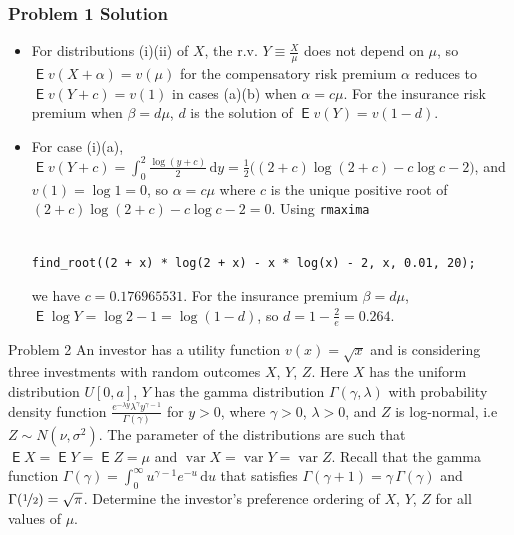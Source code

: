 \documentclass[10pt,handout]{beamer}
\newcommand{\ds}{\displaystyle}
\DeclareMathOperator\expc{\mathsf{E}}
\DeclareMathOperator\var{var}
\theoremstyle{definition}
\begin{document}
\begin{frame}[fragile]
  \frametitle{Problem 1 Solution}
  \begin{itemize}[<+->]
    \item For distributions (i)(ii) of $X$, the r.v. $\ds Y\equiv\frac{X}{\mu}$ does not depend on $\mu$, so $\ds\expc v(X + \alpha) = v(\mu)$ for the compensatory risk premium $\alpha$ reduces to $\ds\expc v(Y + c) = v(1)$ in cases (a)(b) when $\alpha=c\mu$. For the insurance risk premium when $\beta = d\mu$, $d$ is the solution of $\expc v(Y) = v(1 - d)$.
    \item For case (i)(a), $\ds\expc v(Y + c) = \int_0^2\frac{\log(y + c)}{2}\,\text{d}y = \frac{1}{2}\big((2 + c)\log(2 + c) - c\log c - 2\big)$, and $v(1) = \log 1 = 0$, so $\alpha = c\mu$ where $c$ is the unique positive root of $(2 + c)\log(2 + c) - c\log c - 2 = 0$. Using {\tt rmaxima}
\begin{verbatim}

find_root((2 + x) * log(2 + x) - x * log(x) - 2, x, 0.01, 20);

\end{verbatim}
  we have $c = 0.176965531$. For the insurance premium $\beta = d\mu$, $\ds\expc\log Y = \log 2 - 1 = \log(1 - d)$, so $\ds d = 1 - \frac{2}{e} = 0.264$.
  \end{itemize}
\end{frame}

\begin{frame}{Problem 2}
  An investor has a utility function $v(x) = \sqrt{x}$ and is considering three investments with random outcomes $X$, $Y$, $Z$. Here $X$ has the uniform distribution $U[0, a]$, $Y$ has the gamma distribution $\Gamma(\gamma,\lambda)$ with probability density function $\ds\frac{e^{-\lambda y}\lambda^\gamma y^{\gamma - 1}}{\Gamma(\gamma)}$ for $y > 0$, where $\gamma > 0$, $\lambda > 0$, and $Z$ is log-normal, i.e $Z\sim N(\nu, \sigma^2)$. The parameter of the distributions are such that $\expc X = \expc Y = \expc Z = \mu$ and $\var X = \var Y = \var Z$. Recall that the gamma function $\ds\Gamma(\gamma) = \int_0^\infty u^{\gamma - 1} e^{-u}\,\text{d}u$ that satisfies $\Gamma(\gamma + 1) = \gamma\,\Gamma(\gamma)$ and $\Gamma(\nicefrac{1}{2}) = \sqrt{\pi}$. Determine the investor's preference ordering of $X$, $Y$, $Z$ for all values of $\mu$.
\end{frame}
\end{document}
